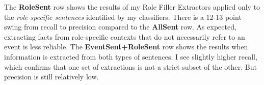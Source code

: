 The \textbf{RoleSent} row shows the results of my Role Filler
Extractors applied only to the {\it role-specific
  sentences} identified by my classifiers. There is a 12-13
point swing from recall to precision compared to the
\textbf{AllSent} row. 
As expected, extracting facts from
role-specific contexts that do not necessarily refer to an event is
less reliable. The \textbf{EventSent+RoleSent} row shows the results when
information is extracted from both types of sentences. I see slightly
higher recall, which confirms that
one set of extractions is not a strict subset of the other. But
precision is still relatively low.


















